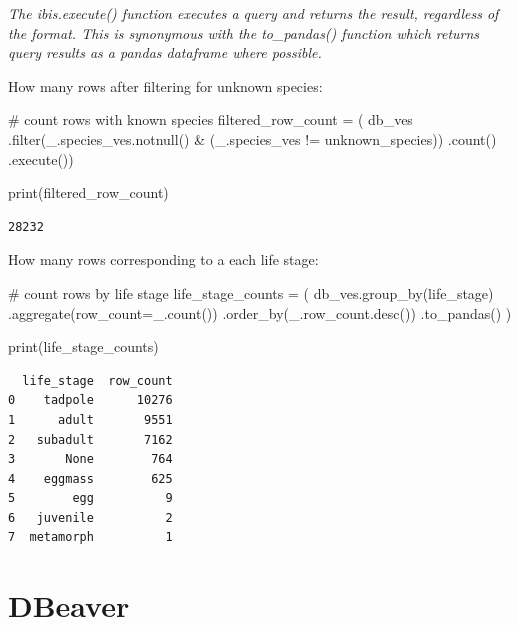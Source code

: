\documentclass[
  letterpaper,
  DIV=11,
  numbers=noendperiod]{scrartcl}
\newenvironment{Shaded}{\begin{snugshade}}{\end{snugshade}}
\newcommand{\BuiltInTok}[1]{\textcolor[rgb]{0.00,0.23,0.31}{#1}}
\newcommand{\CommentTok}[1]{\textcolor[rgb]{0.37,0.37,0.37}{#1}}
\newcommand{\NormalTok}[1]{\textcolor[rgb]{0.00,0.23,0.31}{#1}}
\newcommand{\OperatorTok}[1]{\textcolor[rgb]{0.37,0.37,0.37}{#1}}
\newcommand{\StringTok}[1]{\textcolor[rgb]{0.13,0.47,0.30}{#1}}
\begin{document}
\emph{The ibis.execute() function executes a query and returns the
result, regardless of the format. This is synonymous with the
to\_pandas() function which returns query results as a pandas dataframe
where possible.}

How many rows after filtering for unknown species:

\begin{Shaded}
\begin{Highlighting}[]
\CommentTok{\# count rows with known species}
\NormalTok{filtered\_row\_count }\OperatorTok{=}\NormalTok{ (}
\NormalTok{  db\_ves}
\NormalTok{  .}\BuiltInTok{filter}\NormalTok{(\_.species\_ves.notnull() }\OperatorTok{\&}\NormalTok{ (\_.species\_ves }\OperatorTok{!=} \StringTok{\textquotesingle{}unknown\_species\textquotesingle{}}\NormalTok{))}
\NormalTok{  .count()}
\NormalTok{  .execute())}

\BuiltInTok{print}\NormalTok{(filtered\_row\_count)}
\end{Highlighting}
\end{Shaded}

\begin{verbatim}
28232
\end{verbatim}

How many rows corresponding to a each life stage:

\begin{Shaded}
\begin{Highlighting}[]
\CommentTok{\# count rows by life stage}
\NormalTok{life\_stage\_counts }\OperatorTok{=}\NormalTok{ (}
\NormalTok{    db\_ves.group\_by(}\StringTok{\textquotesingle{}life\_stage\textquotesingle{}}\NormalTok{)}
\NormalTok{    .aggregate(row\_count}\OperatorTok{=}\NormalTok{\_.count())}
\NormalTok{    .order\_by(\_.row\_count.desc())}
\NormalTok{    .to\_pandas()}
\NormalTok{)}

\BuiltInTok{print}\NormalTok{(life\_stage\_counts)}
\end{Highlighting}
\end{Shaded}

\begin{verbatim}
  life_stage  row_count
0    tadpole      10276
1      adult       9551
2   subadult       7162
3       None        764
4    eggmass        625
5        egg          9
6   juvenile          2
7  metamorph          1
\end{verbatim}

\section{DBeaver}
\end{document}
